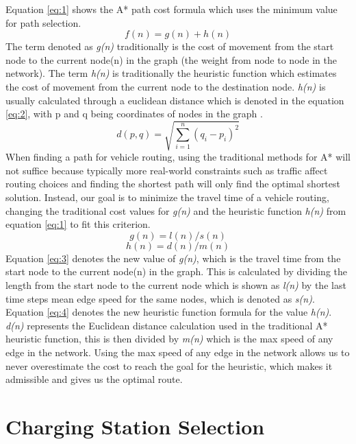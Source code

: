 \documentclass[11pt]{report}
\begin{document}
Equation \ref{eq:1} shows the A* path cost formula which uses the minimum value for path selection.
\begin{equation} \label{eq:1}
f(n)=g(n)+h(n)
\end{equation}
The term denoted as \emph{g(n)} traditionally is the cost of movement from the start node to the current node(n) in the graph (the weight from node to node in the network). The term \emph{h(n)} is traditionally the heuristic function which estimates the cost of movement from the current node to the destination node. \emph{h(n)} is usually calculated through a euclidean distance which is denoted in the equation \ref{eq:2}, with p and q being coordinates of nodes in the graph \autocite{pathComparison2012}.
\begin{equation} \label{eq:2}
 d\left( p,q\right)   = \sqrt {\sum _{i=1}^{n}  \left( q_{i}-p_{i}\right)^2 } 
\end{equation}
When finding a path for vehicle routing, using the traditional methods for A* will not suffice because typically more real-world constraints such as traffic affect routing choices and finding the shortest path will only find the optimal shortest solution. Instead, our goal is to minimize the travel time of a vehicle routing, changing the traditional cost values for \emph{g(n)} and the heuristic function \emph{h(n)} from equation \ref{eq:1} to fit this criterion.
\begin{equation} \label{eq:3}
    g(n)=l(n)/s(n)
\end{equation}
\begin{equation} \label{eq:4}
    h(n)=d(n)/m(n)
\end{equation}
Equation \ref{eq:3} denotes the new value of \emph{g(n)}, which is the travel time from the start node to the current node(n) in the graph. This is calculated by dividing the length from the start node to the current node which is shown as \emph{l(n)} by the last time steps mean edge speed for the same nodes, which is denoted as \emph{s(n)}. Equation \ref{eq:4} denotes the new heuristic function formula for the value \emph{h(n)}. \emph{d(n)} represents the Euclidean distance calculation used in the traditional A* heuristic function, this is then divided by \emph{m(n)} which is the max speed of any edge in the network. Using the max speed of any edge in the network allows us to never overestimate the cost to reach the goal for the heuristic, which makes it admissible and gives us the optimal route.

\section{Charging Station Selection}
\end{document}
